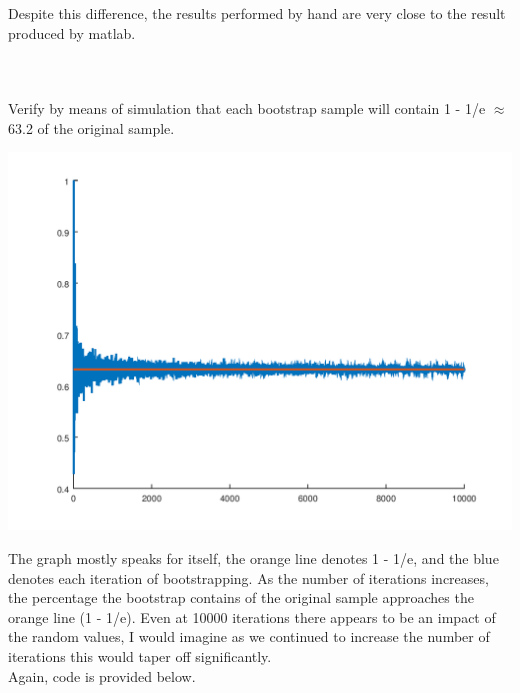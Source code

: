 \documentclass{jhwhw}
\begin{document}
    Despite this difference, the results performed by hand are very close to the result produced by matlab. \\

    \clearpage
    \inputminted[frame=lines,framesep=2mm]{matlab}{p1.m}
    \inputminted[frame=lines,framesep=2mm]{matlab}{phi.m}
    \inputminted[frame=lines,framesep=2mm]{matlab}{p1predict.m}

\problem{}

    Verify by means of simulation that each bootstrap sample will contain 1 - 1/e $\approx$ 63.2 of the original sample.

\solution

    \begin{center}
	\includegraphics[scale=0.8]{p2.png}
    \end{center}

    The graph mostly speaks for itself, the orange line denotes 1 - 1/e, and the blue denotes each
    iteration of bootstrapping. As the number of iterations increases, the percentage the bootstrap contains
    of the original sample approaches the orange line (1 - 1/e). Even at 10000 iterations there appears to be
    an impact of the random values, I would imagine as we continued to increase the number of iterations
    this would taper off significantly. \\

    Again, code is provided below. \\
    \clearpage
    \inputminted[frame=lines,framesep=2mm]{matlab}{p2.m}

\problem{}
\end{document}
